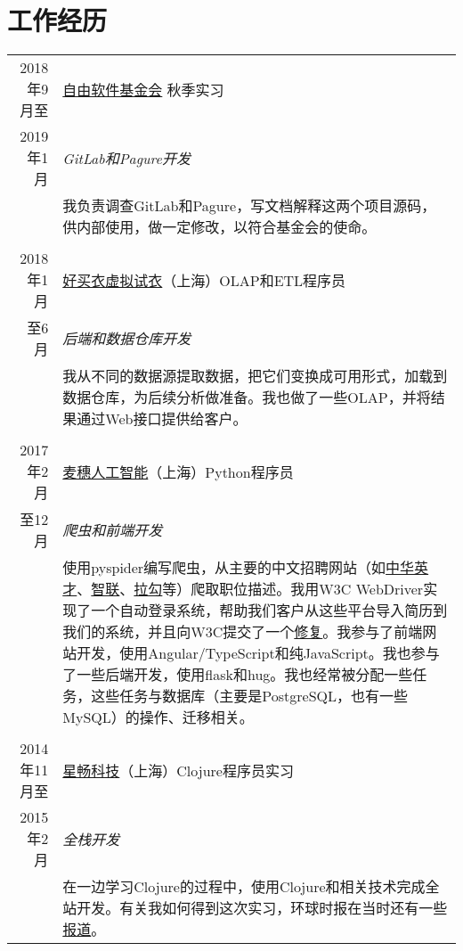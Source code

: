 \documentclass[a4paper,11pt]{article}
\begin{document}
\section{工作经历}
\begin{tabularx}{\textwidth}{r|X}
  2018年9月至 & \href{https://www.fsf.org/}{自由软件基金会} \hfill 秋季实习 \\
  2019年1月    & \emph{GitLab和Pagure开发} \\
               & \footnotesize 我负责调查GitLab和Pagure，写文档解释这两个项目源码，供内部使用，做一定修改，以符合基金会的使命。\\
  \multicolumn{2}{c}{} \\
  2018年1月    & \href{https://www.haomaiyi.com/}{好买衣虚拟试衣}（上海）\hfill OLAP和ETL程序员 \\
  至6月       & \emph{后端和数据仓库开发}\\
               & \footnotesize 我从不同的数据源提取数据，把它们变换成可用形式，加载到数据仓库，为后续分析做准备。我也做了一些OLAP，并将结果通过Web接口提供给客户。\\
  \multicolumn{2}{c}{} \\
  2017年2月    & \href{https://www.mesoor.com/}{麦穗人工智能}（上海）\hfill Python程序员 \\
  至12月       & \emph{爬虫和前端开发}\\
               & \footnotesize 使用pyspider编写爬虫，从主要的中文招聘网站（如\href{http://www.chinahr.com/}{中华英才}、\href{https://www.zhaopin.com/}{智联}、\href{https://www.lagou.com/}{拉勾}等）爬取职位描述。我用W3C WebDriver实现了一个自动登录系统，帮助我们客户从这些平台导入简历到我们的系统，并且向W3C提交了一个\href{https://github.com/w3c/web-platform-tests/pull/6743}{修复}。我参与了前端网站开发，使用Angular/TypeScript和纯JavaScript。我也参与了一些后端开发，使用flask和hug。我也经常被分配一些任务，这些任务与数据库（主要是PostgreSQL，也有一些MySQL）的操作、迁移相关。\\
  \multicolumn{2}{c}{} \\
  2014年11月至 & \href{http://www.starworking.com/}{星畅科技}（上海）\hfill Clojure程序员实习 \\
  2015年2月    & \emph{全栈开发}\\
               & \footnotesize 在一边学习Clojure的过程中，使用Clojure和相关技术完成全站开发。有关我如何得到这次实习，环球时报在当时还有一些\href{http://www.globaltimes.cn/content/871111.shtml}{报道}。
\end{tabularx}

\end{document}
